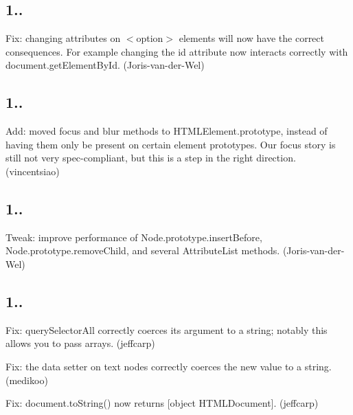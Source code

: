\subsection*{1..}


\begin{DoxyItemize}
\item Fix\+: changing attributes on {\ttfamily $<$option$>$} elements will now have the correct consequences. For example changing the {\ttfamily id} attribute now interacts correctly with {\ttfamily document.\+get\+Element\+By\+Id}. (Joris-\/van-\/der-\/\+Wel)
\end{DoxyItemize}

\subsection*{1..}


\begin{DoxyItemize}
\item Add\+: moved {\ttfamily focus} and {\ttfamily blur} methods to {\ttfamily H\+T\+M\+L\+Element.\+prototype}, instead of having them only be present on certain element prototypes. Our focus story is still not very spec-\/compliant, but this is a step in the right direction. (vincentsiao)
\end{DoxyItemize}

\subsection*{1..}


\begin{DoxyItemize}
\item Tweak\+: improve performance of {\ttfamily Node.\+prototype.\+insert\+Before}, {\ttfamily Node.\+prototype.\+remove\+Child}, and several {\ttfamily Attribute\+List} methods. (Joris-\/van-\/der-\/\+Wel)
\end{DoxyItemize}

\subsection*{1..}


\begin{DoxyItemize}
\item Fix\+: {\ttfamily query\+Selector\+All} correctly coerces its argument to a string; notably this allows you to pass arrays. (jeffcarp)
\item Fix\+: the {\ttfamily data} setter on text nodes correctly coerces the new value to a string. (medikoo)
\item Fix\+: {\ttfamily document.\+to\+String()} now returns {\ttfamily \mbox{[}object H\+T\+M\+L\+Document\mbox{]}}. (jeffcarp)
\end{DoxyItemize}

